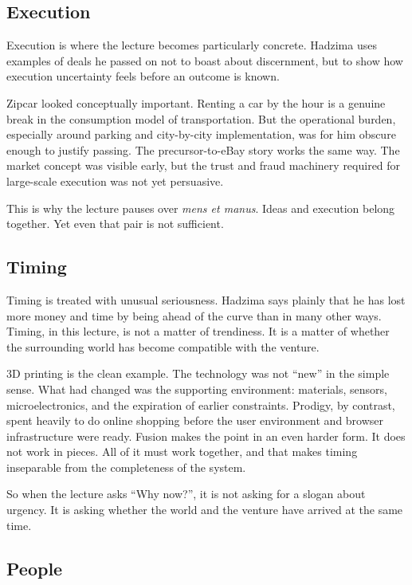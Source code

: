 \subsection{Execution}

Execution is where the lecture becomes particularly concrete. Hadzima uses examples of deals he passed on not to boast about discernment, but to show how execution uncertainty feels before an outcome is known.

Zipcar looked conceptually important. Renting a car by the hour is a genuine break in the consumption model of transportation. But the operational burden, especially around parking and city-by-city implementation, was for him obscure enough to justify passing. The precursor-to-eBay story works the same way. The market concept was visible early, but the trust and fraud machinery required for large-scale execution was not yet persuasive.

This is why the lecture pauses over \textit{mens et manus}. Ideas and execution belong together. Yet even that pair is not sufficient.

\subsection{Timing}

Timing is treated with unusual seriousness. Hadzima says plainly that he has lost more money and time by being ahead of the curve than in many other ways. Timing, in this lecture, is not a matter of trendiness. It is a matter of whether the surrounding world has become compatible with the venture.

3D printing is the clean example. The technology was not ``new'' in the simple sense. What had changed was the supporting environment: materials, sensors, microelectronics, and the expiration of earlier constraints. Prodigy, by contrast, spent heavily to do online shopping before the user environment and browser infrastructure were ready. Fusion makes the point in an even harder form. It does not work in pieces. All of it must work together, and that makes timing inseparable from the completeness of the system.

So when the lecture asks ``Why now?'', it is not asking for a slogan about urgency. It is asking whether the world and the venture have arrived at the same time.

\subsection{People}

